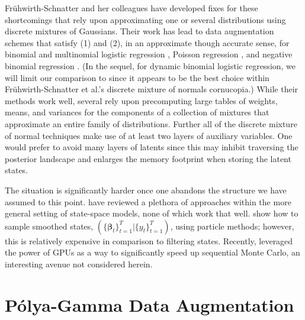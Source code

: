 \documentclass[12pt]{article}
\newcommand{\Polya}{P\'{o}lya}
\newcommand{\bbeta}{\boldsymbol{\beta}}
\newcounter{parnum}
\newcommand{\npoint}{%
  \noindent\refstepcounter{parnum}%
  \makebox[0.5in][c]{\textbf{\arabic{parnum}.}} %
  \marginnote{\small\ttfamily\the\inputlineno}}
\renewcommand{\npoint}{}
\begin{document}
\npoint Fr\"{u}hwirth-Schnatter and her colleagues have developed fixes for
these shortcomings that rely upon approximating one or several distributions
using discrete mixtures of Gaussians.  Their work has lead to data augmentation
schemes that satisfy (1) and (2), in an approximate though accurate sense, for
binomial and multinomial logistic regression
\citep{fruhwirth-schnatter-fruhwirth-2007, fruhwirth-schnatter-fruhwirth-2010,
  fussl-etal-2013}, Poisson regression \citep{fruhwirth-schnatter-wagner-2006,
  fruhwirth-schnatter-etal-2009}, and negative binomial regression
\citep{fruhwirth-schnatter-etal-2009}.  (In the sequel, for dynamic binomial
logistic regression, we will limit our comparison to \cite{fussl-etal-2013}
since it appears to be the best choice within Fr\"{u}hwirth-Schnatter et al.'s
discrete mixture of normals cornucopia.)
\npoint While their methods work well, several rely upon precomputing large
tables of weights, means, and variances for the components of a collection of
mixtures that approximate an entire family of distributions.  Further all of the
discrete mixture of normal techniques make use of at least two layers of
auxiliary variables.  One would prefer to avoid many layers of latents since
this may inhibit traversing the posterior landscape and enlarges the memory
footprint when storing the latent states.

\npoint The situation is significantly harder once one abandons the structure we
have assumed to this point.  \cite{geweke-tanizaki-2001} have reviewed a
plethora of approaches within the more general setting of state-space models,
none of which work that well.  \cite{godsill-etal-2004} show how to sample
smoothed states, $(\{\bbeta_t\}_{t=1}^T | \{y_t\}_{t=1}^T)$, using particle
methods; however, this is relatively expensive in comparison to filtering
states.  Recently, \cite{geweke-etal-2013} leveraged the power of GPUs as a way
to significantly speed up sequential Monte Carlo, an interesting avenue not
considered herein.

\section{\Polya-Gamma Data Augmentation}
\label{sec:pg}
\end{document}
